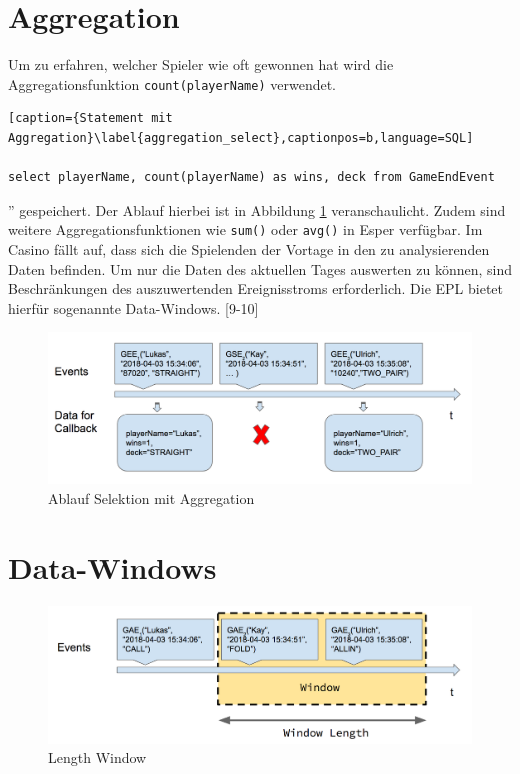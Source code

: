 \section{Aggregation}

Um zu erfahren, welcher Spieler wie oft gewonnen hat wird die Aggregationsfunktion \texttt{count(playerName)} verwendet.
\begin{lstlisting}[caption={Statement mit Aggregation}\label{aggregation_select},captionpos=b,language=SQL]

select playerName, count(playerName) as wins, deck from GameEndEvent

\end{lstlisting}
'' gespeichert.
Der Ablauf hierbei ist in Abbildung \ref{aggregation_select_img} veranschaulicht. 
Zudem sind weitere Aggregationsfunktionen wie \texttt{sum()} oder \texttt{avg()} in Esper verfügbar.
Im Casino fällt auf, dass sich die Spielenden der Vortage in den zu analysierenden Daten befinden. Um nur die Daten des aktuellen Tages auswerten zu können, sind Beschränkungen des auszuwertenden Ereignisstroms erforderlich. Die \acf{EPL} bietet hierfür sogenannte Data-Windows.
\cite{EsperRef2018}[9-10]

\begin{figure}[ht]
	\centering
	\includegraphics[width=\textwidth,height=\textheight, keepaspectratio]{images/statement_basic_aggregation.png}
	\caption{Ablauf Selektion mit Aggregation}
	\label{aggregation_select_img}
\end{figure}

\section{Data-Windows}
\label{Data-Windows}
\begin{figure}[ht]
	\centering
	\includegraphics[width=\textwidth,height=\textheight,keepaspectratio]{images/data_window_length.png}
	\caption{Length Window}
	\label{LengthWindow}
\end{figure}

